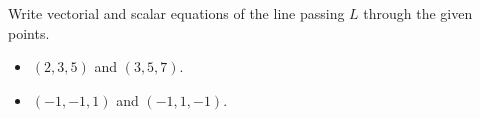 Write vectorial and scalar equations of the line passing $L$ through the given points.

\begin{itemize}
\item $(2,3,5)$ and $(3,5,7)$.


\item $(-1,-1,1)$ and $(-1,1,-1)$.

\end{itemize}